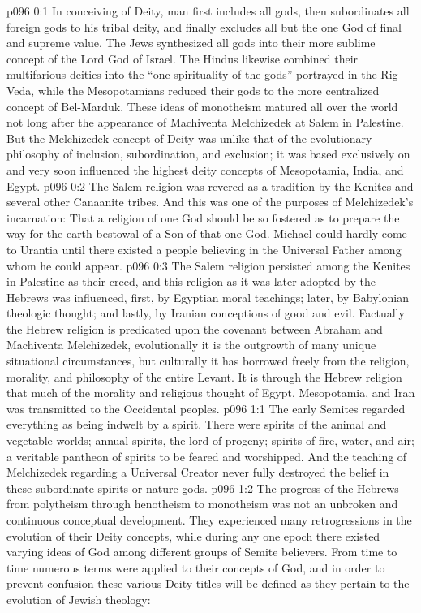 \author{Melchizedek}
\vs p096 0:1 In conceiving of Deity, man first includes all gods, then subordinates all foreign gods to his tribal deity, and finally excludes all but the one God of final and supreme value. The Jews synthesized all gods into their more sublime concept of the Lord God of Israel. The Hindus likewise combined their multifarious deities into the “one spirituality of the gods” portrayed in the Rig\hyp{}Veda, while the Mesopotamians reduced their gods to the more centralized concept of Bel\hyp{}Marduk. These ideas of monotheism matured all over the world not long after the appearance of Machiventa Melchizedek at Salem in Palestine. But the Melchizedek concept of Deity was unlike that of the evolutionary philosophy of inclusion, subordination, and exclusion; it was based exclusively on  and very soon influenced the highest deity concepts of Mesopotamia, India, and Egypt.
\vs p096 0:2 \pc The Salem religion was revered as a tradition by the Kenites and several other Canaanite tribes. And this was one of the purposes of Melchizedek’s incarnation: That a religion of one God should be so fostered as to prepare the way for the earth bestowal of a Son of that one God. Michael could hardly come to Urantia until there existed a people believing in the Universal Father among whom he could appear.
\vs p096 0:3 The Salem religion persisted among the Kenites in Palestine as their creed, and this religion as it was later adopted by the Hebrews was influenced, first, by Egyptian moral teachings; later, by Babylonian theologic thought; and lastly, by Iranian conceptions of good and evil. Factually the Hebrew religion is predicated upon the covenant between Abraham and Machiventa Melchizedek, evolutionally it is the outgrowth of many unique situational circumstances, but culturally it has borrowed freely from the religion, morality, and philosophy of the entire Levant. It is through the Hebrew religion that much of the morality and religious thought of Egypt, Mesopotamia, and Iran was transmitted to the Occidental peoples.
\vs p096 1:1 The early Semites regarded everything as being indwelt by a spirit. There were spirits of the animal and vegetable worlds; annual spirits, the lord of progeny; spirits of fire, water, and air; a veritable pantheon of spirits to be feared and worshipped. And the teaching of Melchizedek regarding a Universal Creator never fully destroyed the belief in these subordinate spirits or nature gods.
\vs p096 1:2 The progress of the Hebrews from polytheism through henotheism to monotheism was not an unbroken and continuous conceptual development. They experienced many retrogressions in the evolution of their Deity concepts, while during any one epoch there existed varying ideas of God among different groups of Semite believers. From time to time numerous terms were applied to their concepts of God, and in order to prevent confusion these various Deity titles will be defined as they pertain to the evolution of Jewish theology:
